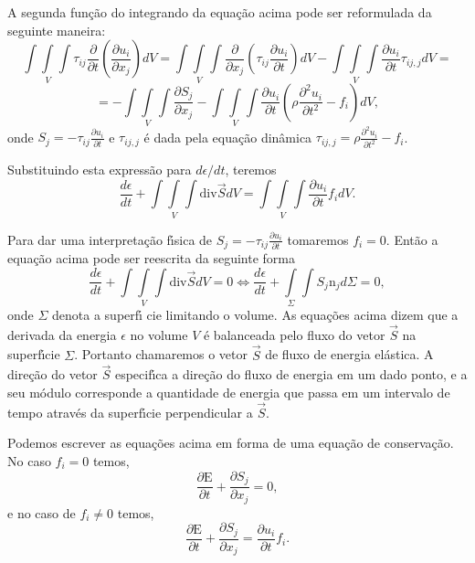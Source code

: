 A segunda fun\c{c}\~ao do integrando da equa\c{c}\~ao acima pode ser reformulada da seguinte
maneira:
\[\int \! \!\int\limits_{V} \! \!\int\tau_{ij}
\frac{\partial}{\partial t}\left(\frac{\partial u_{i}}{\partial
x_{j}}\right)dV= \int \! \!\int\limits_{V} \! \!\int
\frac{\partial}{\partial x_{j}}\left(\tau_{ij}\frac{\partial
u_{i}}{\partial t}\right)dV- \int \! \!\int\limits_{V} \! \!\int
\frac{\partial u_{i}}{\partial t} \tau_{ij,j}dV=\]
\[=-\int \! \!\int\limits_{V} \! \!\int \frac{\partial S_{j}}{\partial x_{j}}-
\int \! \!\int\limits_{V} \! \!\int\frac{\partial u_{i}}{\partial
t}\left(\rho\frac{\partial^{2} u_{i}}{\partial
t^{2}}-f_{i}\right)dV,\]
onde $S_{j}=-\tau_{ij}\frac{\partial
u_{i}}{\partial t}$ e $\tau_{ij,j}$ \'e dada pela equa\c{c}\~ao din\^amica $\tau_{ij,j}=\rho
\frac{\partial^{2} u_{i}}{\partial t^{2}}-f_{i}$.

Substituindo esta express\~ao para $d\epsilon/dt$, teremos
\[\frac{d\epsilon}{dt}+\int \! \!\int\limits_{V} \! \!\int \mbox{div} \vec{S}dV=\int \! \!\int\limits_{V} \! \!\int
\frac{\partial u_{i}}{\partial t}f_{i}dV. \]

Para dar uma interpreta\c{c}\~ao f\'\i sica de
$S_{j}=-\tau_{ij}\frac{\partial u_{i}}{\partial t}$ tomaremos
$f_{i}=0$. Ent\~ao a equa\c{c}\~ao acima pode ser reescrita da
seguinte forma
\[\frac{d\epsilon}{dt}+\int \! \!\int\limits_{V} \! \!\int \mbox{div} \vec{S}dV=0\Leftrightarrow
\frac{d\epsilon}{dt}+\int\limits_{\Sigma} \! \!\int
S_{j}\mbox{n}_{j}d\Sigma=0,\] onde $\Sigma$ denota a superf\'\i
cie limitando o volume. As equa\c{c}\~oes acima dizem que a
derivada da energia $\epsilon$ no volume $V$ \'e balanceada pelo
fluxo do vetor $\vec{S}$ na superf\'\i cie $\Sigma$. Portanto
chamaremos o vetor $\vec{S}$ de fluxo de energia el\'astica. A
dire\c{c}\~ao do vetor $\vec{S}$ especif\'\i ca a dire\c{c}\~ao do
fluxo de energia em um dado ponto, e a seu m\'odulo corresponde a
quantidade de energia que passa em um intervalo de tempo atrav\'es
da superf\'\i cie perpendicular a $\vec{S}$.

Podemos escrever as equa\c{c}\~oes acima em forma de uma
equa\c{c}\~ao de conserva\c{c}\~ao. No caso $f_{i}=0$ temos,
\[\frac{\partial \mbox{E}}{\partial t}+\frac{\partial S_{j}}{\partial x_{j}}=0,\]
e no caso de $f_{i} \neq 0$ temos,
\[\frac{\partial \mbox{E}}{\partial t}+\frac{\partial S_{j}}{\partial x_{j}}=
\frac{\partial u_{i}}{\partial t}f_{i}.\]









%
%
%
